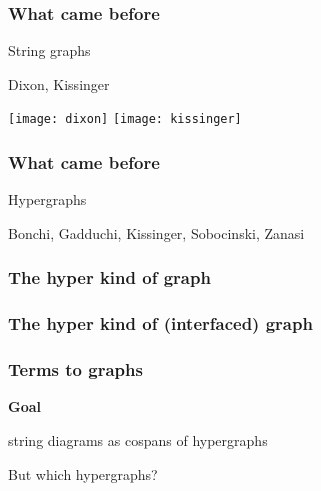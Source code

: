 \begin{frame}
    \frametitle{What came before}

    \pause
    \centering
    \LARGE
    String graphs

    \normalsize
    \vspace{1em}
    Dixon, Kissinger

    \texttt{[image: dixon]}
    \texttt{[image: kissinger]}

\end{frame}
\begin{frame}
    \frametitle{What came before}

    \centering
    \LARGE
    Hypergraphs
    \quad

    \normalsize
    \vspace{1em}
    Bonchi, Gadduchi, Kissinger, Sobocinski, Zanasi

    \hypergraphpeople

\end{frame}
\begin{frame}
    \frametitle{The hyper kind of graph}

    \centering

\end{frame}
\begin{frame}
    \frametitle{The hyper kind of (interfaced) graph}

    \centering

\end{frame}
\begin{frame}
    \frametitle{Terms to graphs}

    \centering
    \LARGE

    \textbf{Goal}

    \alert{string diagrams} as \alert{cospans of hypergraphs}

    \vspace{1em}
    \pause

    But which hypergraphs?

\end{frame}
